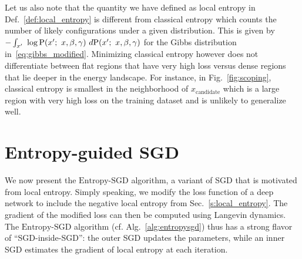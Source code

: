 \documentclass[10pt]{article}
\newcommand{\entropysgd}{\mathrm{Entropy}\textrm{-}\mathrm{SGD}}
\newcommand{\ignore}[1]{}
\begin{document}
Let us also note that the quantity we have defined as local entropy in Def.~\ref{def:local_entropy} is different from classical entropy which counts the number of likely configurations under a given distribution. This is given by
$
    - \int_{x'}\ \log \mathrm{P}(x';\ x, \beta, \gamma)\ d \mathrm{P}(x';\ x, \beta, \gamma)
$
for the Gibbs distribution in~\eqref{eq:gibbs_modified}. Minimizing classical entropy however does not differentiate between flat regions that have very high loss versus dense regions that lie deeper in the energy landscape. For instance, in Fig.~\ref{fig:scoping}, classical entropy is smallest in the neighborhood of $x_{\textrm{candidate}}$ which is a large region with very high loss on the training dataset and is unlikely to generalize well.
\ignore{We could minimize a modified loss function of the form $f(x) + \lambda S(x, \g)$ whose gradient can be computed to be
$$
    \nabla \Big(f(x) + \lambda S(x, \g)\Big) = \nabla f(x) - \lambda \g\ \corr (g(x'),\ x-x');
$$
where we have defined the cross-correlation as
$$
    \corr (g(x'),\ x-x') := \ag{g(x')\ (x-x')} - \ag{g(x')}\ \ag{x-x'};
$$
with $g(x') = f(x') + \f{\g}{2}\ \norm{x-x'}^2_2$. The gradient of the entropy can again be estimated using Langevin dynamics. Practically, one then has to modulate the hyper-parameter $\lambda$ during the course of the training to first use the gradient $\nabla f(x)$ to make progress and then turn on the entropy term to scope dense clusters.}

\section{Entropy-guided SGD}
\label{s:entropysgd}

We now present the $\entropysgd$ algorithm, a variant of SGD that is motivated from local entropy. Simply speaking, we modify the loss function of a deep network to include the negative local entropy from Sec.~\ref{s:local_entropy}. The gradient of the modified loss can then be computed using Langevin dynamics. The $\entropysgd$ algorithm (cf. Alg.~\ref{alg:entropysgd}) thus has a strong flavor of ``SGD-inside-SGD'': the outer SGD updates the parameters, while an inner SGD estimates the gradient of local entropy at each iteration.
\end{document}
